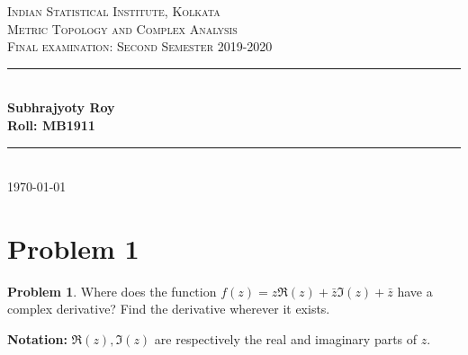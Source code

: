 \documentclass[12pt]{article}
\newcommand{\HRule}{\rule{\linewidth}{0.5mm}} %
\theoremstyle{definition}
\newtheorem*{prb}{Problem}
\newenvironment{problem}{
\begin{tcolorbox}[colback=blue!5!white,colframe=blue!75!black, parbox = true] \begin{prb}  }{\end{prb}\end{tcolorbox} }
\numberwithin{equation}{section}
\begin{document}
\begin{titlepage}
    
\centering
\textsc{\LARGE Indian Statistical Institute, Kolkata}\\[1.5cm] %
\textsc{\Large Metric Topology and Complex Analysis}\\[0.5cm] %
\textsc{\large Final examination: Second Semester 2019-2020}\\[0.5cm] %

\HRule \\[0.4cm]
\large \textbf{Subhrajyoty Roy}\\
\large \textbf{Roll:  MB1911}\\
\HRule \\[1.5cm]
\normalsize \today

\end{titlepage}


\tableofcontents
\clearpage



\section{Problem 1}

\begin{problem}
	Where does the function $f(z) = z \Re(z) + \bar{z} \Im(z) + \bar{z}$ have a complex derivative? Find the derivative wherever it exists. 

	\textbf{Notation:} $\Re(z), \Im(z)$ are respectively the real and imaginary parts of $z$. 
\end{problem}
\end{document}

